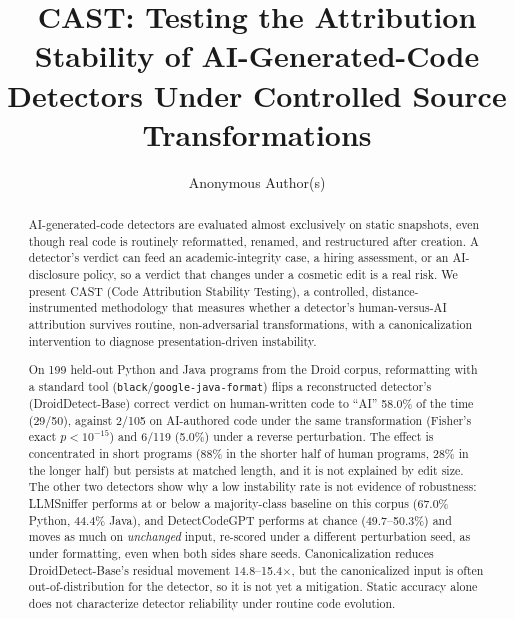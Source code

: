 \documentclass[sigconf,review,anonymous]{acmart}
\begin{document}
\title{CAST: Testing the Attribution Stability of AI-Generated-Code Detectors Under Controlled Source Transformations}

\author{Anonymous Author(s)}

\begin{abstract}
AI-generated-code detectors are evaluated almost exclusively on static snapshots, even though real code is routinely reformatted, renamed, and restructured after creation. A detector's verdict can feed an academic-integrity case, a hiring assessment, or an AI-disclosure policy, so a verdict that changes under a cosmetic edit is a real risk. We present CAST (Code Attribution Stability Testing), a controlled, distance-instrumented methodology that measures whether a detector's human-versus-AI attribution survives routine, non-adversarial transformations, with a canonicalization intervention to diagnose presentation-driven instability.

On 199 held-out Python and Java programs from the Droid corpus, reformatting with a standard tool (\texttt{black}/\texttt{google-java-format}) flips a reconstructed detector's (DroidDetect-Base) correct verdict on human-written code to ``AI'' 58.0\% of the time (29/50), against 2/105 on AI-authored code under the same transformation (Fisher's exact $p{<}10^{-15}$) and 6/119 (5.0\%) under a reverse perturbation. The effect is concentrated in short programs (88\% in the shorter half of human programs, 28\% in the longer half) but persists at matched length, and it is not explained by edit size. The other two detectors show why a low instability rate is not evidence of robustness: LLMSniffer performs at or below a majority-class baseline on this corpus (67.0\% Python, 44.4\% Java), and DetectCodeGPT performs at chance (49.7--50.3\%) and moves as much on \emph{unchanged} input, re-scored under a different perturbation seed, as under formatting, even when both sides share seeds. Canonicalization reduces DroidDetect-Base's residual movement 14.8--15.4$\times$, but the canonicalized input is often out-of-distribution for the detector, so it is not yet a mitigation. Static accuracy alone does not characterize detector reliability under routine code evolution.
\end{abstract}


\maketitle
\end{document}
